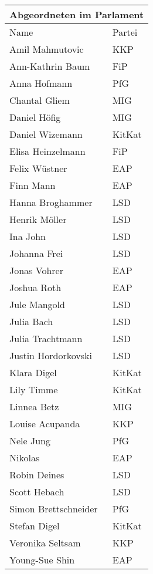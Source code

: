 \documentclass{sasbase}
\begin{document}
\begin{tabular}{ |p{3cm}|p{3cm}| }
 \hline
 \multicolumn{2}{|c|}{Abgeordneten im Parlament} \\
 \hline
 Name & Partei \\
 \hline
Amil Mahmutovic & KKP \\
Ann-Kathrin Baum & FiP\\
Anna Hofmann & PfG\\
Chantal Gliem & MIG\\
Daniel Höfig & MIG\\
Daniel Wizemann & KitKat\\
Elisa Heinzelmann & FiP\\
Felix Wüstner & EAP\\
Finn Mann & EAP\\
Hanna Broghammer & LSD\\
Henrik Möller & LSD\\
Ina John & LSD\\
Johanna Frei & LSD\\
Jonas Vohrer & EAP\\
Joshua Roth & EAP\\
Jule Mangold & LSD\\
Julia Bach & LSD\\
Julia Trachtmann & LSD\\
Justin Hordorkovski & LSD\\
Klara Digel & KitKat\\
Lily Timme & KitKat\\
Linnea Betz & MIG\\
Louise Acupanda & KKP\\
Nele Jung & PfG\\
Nikolas & EAP\\
Robin Deines & LSD\\
Scott Hebach & LSD\\
Simon Brettschneider & PfG\\
Stefan Digel & KitKat\\
Veronika Seltsam & KKP\\
Young-Sue Shin & EAP\\
 \hline
\end{tabular}
\end{document}
